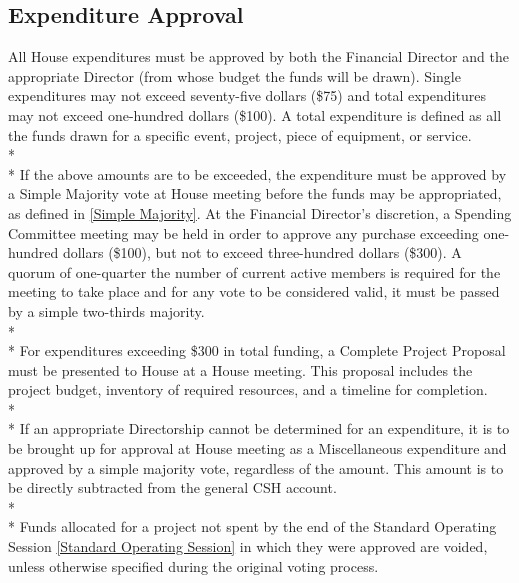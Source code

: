 \documentclass{article}
\newcommand{\bsection}[1]{\subsection{#1} \label{#1}}
\begin{document}
\bsection{Expenditure Approval}
All House expenditures must be approved by both the Financial Director and the appropriate Director (from whose budget the funds will be drawn).
Single expenditures may not exceed seventy-five dollars (\$75) and total expenditures may not exceed one-hundred dollars (\$100).
A total expenditure is defined as all the funds drawn for a specific event, project, piece of equipment, or service.
\\* \\*
If the above amounts are to be exceeded, the expenditure must be approved by a Simple Majority vote at House meeting before the funds may be appropriated, as defined in \ref{Simple Majority}.
At the Financial Director's discretion, a Spending Committee meeting may be held in order to approve any purchase exceeding one-hundred dollars (\$100), but not to exceed three-hundred dollars (\$300).
A quorum of one-quarter the number of current active members is required for the meeting to take place and for any vote to be considered valid, it must be passed by a simple two-thirds majority.
\\*\\*
For expenditures exceeding \$300 in total funding, a Complete Project Proposal must be presented to House at a House meeting.
This proposal includes the project budget, inventory of required resources, and a timeline for completion.
\\* \\*
If an appropriate Directorship cannot be determined for an expenditure, it is to be brought up for approval at House meeting as a Miscellaneous expenditure and approved by a simple majority vote, regardless of the amount.
This amount is to be directly subtracted from the general CSH account. 
\\* \\*
Funds allocated for a project not spent by the end of the Standard Operating Session \ref{Standard Operating Session} in which they were approved are voided, unless otherwise specified during the original voting process.
\end{document}
